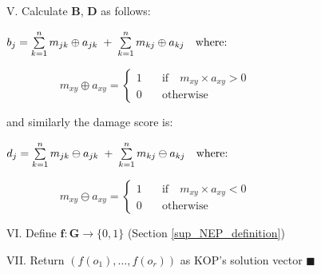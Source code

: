 \documentclass[12pt]{article}	%
\begin{document}
            \noindent V. Calculate $\boldsymbol{B}$, $\boldsymbol{D}$ as follows:



                    \qquad $b_j = \sum\limits_{k=1}^{n} m_{jk} \oplus a_{jk} \hspace{0.1cm}+\hspace{0.1cm} \sum\limits_{k=1}^{n} m_{kj} \oplus a_{kj} \quad\textrm{where:}$

                    \qquad $\hspace{2cm}m_{xy} \oplus a_{xy}  =	\scriptscriptstyle{\begin{cases}	%
                                                        1 & \quad\textrm{if}\quad m_{xy} \times a_{xy} >0 \\
                                                        0 & \quad\textrm{otherwise}
                                                \end{cases}
                                                }$

                    \qquad and similarly the damage score is:

                    \qquad $d_j = \sum\limits_{k=1}^{n} m_{jk} \ominus a_{jk} \hspace{0.1cm}+\hspace{0.1cm} \sum\limits_{k=1}^{n} m_{kj} \ominus a_{kj} \quad\textrm{where:}$

                    \qquad $\hspace{2cm}m_{xy} \ominus a_{xy}  = \scriptscriptstyle{\begin{cases}	%
                                                        1 & \quad\textrm{if}\quad m_{xy} \times a_{xy} < 0 \\
                                                        0 & \quad\textrm{otherwise}
                                                \end{cases}
                                                }$


            \noindent VI. Define $\boldsymbol{f}:\boldsymbol{G}  \rightarrow \{0,1\}$ (Section \ref{sup_NEP_definition})


            \noindent  VII. Return $(f(o_1), \dots, f(o_r))$ as KOP's solution vector \hspace{5pt} $\blacksquare$


\newpage
\end{document}
